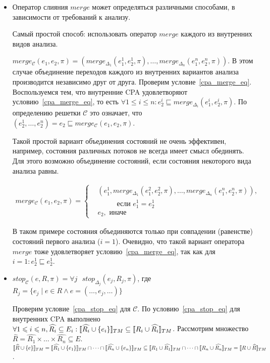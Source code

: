 \begin{itemize}
\qedsymbol

\item 
Оператор слияния $merge$ может определяться различными способами, в зависимости от требований к анализу.

Самый простой способ: использовать оператор $merge$ каждого из внутренних видов анализа.

$merge_{\mathscr{C}}(e_1,e_2,\pi) = (merge_{\Delta_1}(e_1^1, e_2^1,\pi), \dots, merge_{\Delta_n}(e_1^n, e_2^n,\pi))$.
В этом случае объединение переходов каждого из внутренних вариантов анализа производится независимо друг от друга.
Проверим условие~\ref{cpa_merge_eq}.
Воспользуемся тем, что внутренние CPA удовлетворяют условию~\ref{cpa_merge_eq}, то есть $\forall 1 \le i \le n: e_2^i \sqsubseteq merge_{\Delta_i}(e_1^i, e_2^i,\pi)$.
По определению решетки $\mathscr{C}$ это означает, что $(e_2^1, \dots, e_2^n) = e_2 \sqsubseteq merge_{\mathscr{C}}(e_1,e_2,\pi)$.

Такой простой вариант объединения состояний не очень эффективен, например, состояния различных потоков не всегда имеет смысл обединять.
Для этого возможно объединение состояний, если состояния некоторого вида анализа равны. 

\begin{align*}
merge_{\mathscr{C}}(e_1,e_2,\pi) =
\begin{cases}
&(e_1^1, merge_{\Delta_1}(e_1^2, e_2^2,\pi), \dots, merge_{\Delta_n}(e_1^n, e_2^n,\pi)), \\
& \hspace{1cm} \mbox{ если } e_1^1 = e_2^1 \\
& e_2, \mbox{ иначе }
\end{cases} 
\end{align*}

В таком примере состояния объединяются только при совпадении (равенстве) состояний первого анализа ($i=1$).
Очевидно, что такой вариант оператора $merge$ тоже удовлетворяет условию~\ref{cpa_merge_eq}, так как для $i = 1: e_2^1 \sqsubseteq e_2^1$.

\item 
$stop_{\mathscr{C}}(e,R,\pi)=\forall j \mbox{ } stop_{\Delta_j}(e_j, R_j, \pi)$, где $R_j = \{e_j \mid e \in R \land e = (\dots, e_j, \dots)\}$

Проверим условие~\ref{cpa_stop_eq} для $\mathscr{C}$.
По условию~\ref{cpa_stop_eq} для внутренних CPA выполнено $\forall 1 \leqslant i \leqslant n, \widehat{R_i} \subseteq E_i: [\![ \widehat{R_i} \cup \{e_i\} ]\!]_{TM} \subseteq [\![ R_i \cup \widehat{R_i} ]\!]_{TM}$.
Рассмотрим множество $\widehat{R} = \widehat{R_1} \times \dots \times \widehat{R_n} \subseteq E$. 
$\conc{\widehat{R} \cup \{e\}}_{TM} = \conc{\widehat{R_1} \cup \{e_1\}}_{TM} \cap \dots \cap \conc{\widehat{R_n} \cup \{e_n\}}_{TM} \subseteq \conc{R_1 \cup \widehat{R_1}}_{TM} \cap \dots \cap \conc{R_n \cup \widehat{R_n}}_{TM} = \conc{R \cup \widehat{R}}_{TM}$.


\end{itemize}
